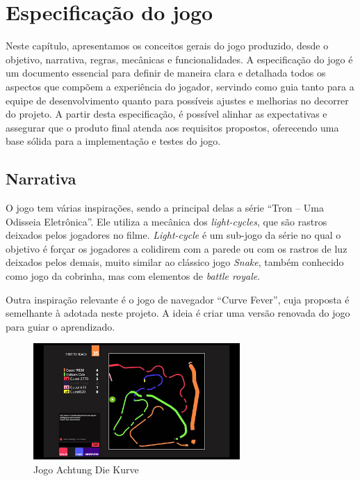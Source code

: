 \chapter[Especificação do jogo]{Especificação do jogo}

Neste capítulo, apresentamos os conceitos gerais do jogo produzido, desde o objetivo, narrativa, regras, mecânicas e funcionalidades. A especificação do jogo é um documento essencial para definir de maneira clara e detalhada todos os aspectos que compõem a experiência do jogador, servindo como guia tanto para a equipe de desenvolvimento quanto para possíveis ajustes e melhorias no decorrer do projeto. A partir desta especificação, é possível alinhar as expectativas e assegurar que o produto final atenda aos requisitos propostos, oferecendo uma base sólida para a implementação e testes do jogo.

\section{Narrativa}

O jogo tem várias inspirações, sendo a principal delas a série “Tron – Uma Odisseia Eletrônica”. Ele utiliza a mecânica dos \textit{light-cycles}, que são rastros deixados pelos jogadores no filme. \textit{Light-cycle} é um sub-jogo da série no qual o objetivo é forçar os jogadores a colidirem com a parede ou com os rastros de luz deixados pelos demais, muito similar ao clássico jogo \textit{Snake}, também conhecido como jogo da cobrinha, mas com elementos de \textit{battle royale}.

Outra inspiração relevante é o jogo de navegador “Curve Fever”, cuja proposta é semelhante à adotada neste projeto. A ideia é criar uma versão renovada do jogo para guiar o aprendizado.

\begin{figure}[htbp]
    \centering
    \caption{Jogo Achtung Die Kurve}
    \label{fig:achtung-kurve}
    \includegraphics[width=0.7\textwidth]{figuras/kuver-fever.png}
\end{figure}

